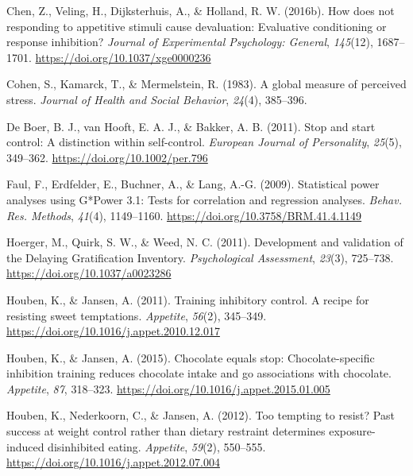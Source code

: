 \documentclass[man,floatsintext]{apa6}
\begin{document}
\leavevmode\hypertarget{ref-chen_how_2016}{}%
Chen, Z., Veling, H., Dijksterhuis, A., \& Holland, R. W. (2016b). How does not responding to appetitive stimuli cause devaluation: Evaluative conditioning or response inhibition? \emph{Journal of Experimental Psychology: General}, \emph{145}(12), 1687--1701. \url{https://doi.org/10.1037/xge0000236}

\leavevmode\hypertarget{ref-cohenGlobalMeasurePerceived1983}{}%
Cohen, S., Kamarck, T., \& Mermelstein, R. (1983). A global measure of perceived stress. \emph{Journal of Health and Social Behavior}, \emph{24}(4), 385--396.

\leavevmode\hypertarget{ref-deboerStopStartControl2011}{}%
De Boer, B. J., van Hooft, E. A. J., \& Bakker, A. B. (2011). Stop and start control: A distinction within self-control. \emph{European Journal of Personality}, \emph{25}(5), 349--362. \url{https://doi.org/10.1002/per.796}

\leavevmode\hypertarget{ref-faul_statistical_2009}{}%
Faul, F., Erdfelder, E., Buchner, A., \& Lang, A.-G. (2009). Statistical power analyses using G*Power 3.1: Tests for correlation and regression analyses. \emph{Behav. Res. Methods}, \emph{41}(4), 1149--1160. \url{https://doi.org/10.3758/BRM.41.4.1149}

\leavevmode\hypertarget{ref-hoergerDevelopmentValidationDelaying2011}{}%
Hoerger, M., Quirk, S. W., \& Weed, N. C. (2011). Development and validation of the Delaying Gratification Inventory. \emph{Psychological Assessment}, \emph{23}(3), 725--738. \url{https://doi.org/10.1037/a0023286}

\leavevmode\hypertarget{ref-houben_training_2011}{}%
Houben, K., \& Jansen, A. (2011). Training inhibitory control. A recipe for resisting sweet temptations. \emph{Appetite}, \emph{56}(2), 345--349. \url{https://doi.org/10.1016/j.appet.2010.12.017}

\leavevmode\hypertarget{ref-houben_chocolate_2015}{}%
Houben, K., \& Jansen, A. (2015). Chocolate equals stop: Chocolate-specific inhibition training reduces chocolate intake and go associations with chocolate. \emph{Appetite}, \emph{87}, 318--323. \url{https://doi.org/10.1016/j.appet.2015.01.005}

\leavevmode\hypertarget{ref-houben_too_2012}{}%
Houben, K., Nederkoorn, C., \& Jansen, A. (2012). Too tempting to resist? Past success at weight control rather than dietary restraint determines exposure-induced disinhibited eating. \emph{Appetite}, \emph{59}(2), 550--555. \url{https://doi.org/10.1016/j.appet.2012.07.004}
\end{document}
